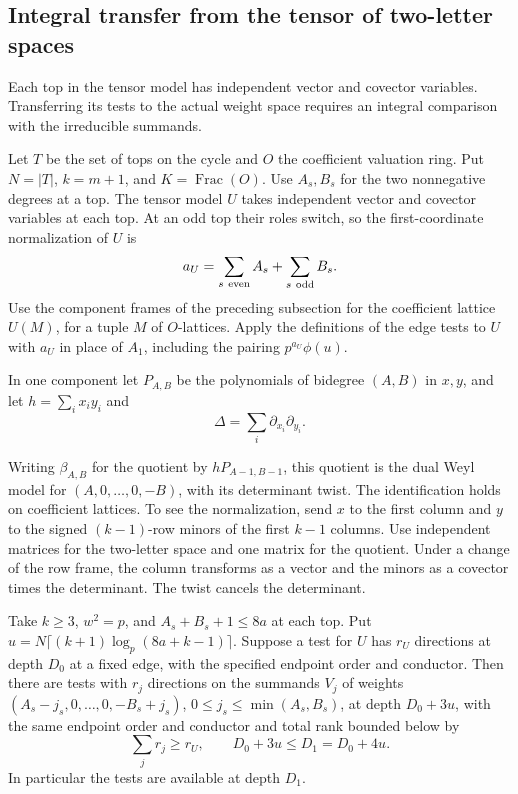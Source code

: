 \subsection{Integral transfer from the tensor of two-letter spaces}
\label{sec:edge-transfer}
\hypertarget{source-edge-transfer}{}

Each top in the tensor model has independent vector and covector variables. Transferring its tests to the actual weight space requires an integral comparison with the irreducible summands.

Let \(T\) be the set of tops on the cycle and \(O\) the coefficient valuation ring. Put \(N=|T|\), \(k=m+1\), and \(K=\operatorname{Frac}(O)\).
Use \(A_s,B_s\) for the two nonnegative degrees at a top.
The tensor model \(U\) takes independent vector and covector
variables at each top. At an odd top their roles switch, so the
first-coordinate normalization of \(U\) is
\[
 a_U=\sum_{s\ {\rm even}}A_s+\sum_{s\ {\rm odd}}B_s.
\]
Use the component frames of the preceding subsection for the
coefficient lattice \(U(M)\), for a tuple \(M\) of \(O\)-lattices.
Apply the definitions of the edge tests to \(U\) with \(a_U\) in
place of \(A_1\), including the pairing \(p^{a_U}\phi(u)\).

In one component let \(P_{A,B}\) be the polynomials of bidegree
\((A,B)\) in \(x,y\), and let \(h=\sum_i x_i y_i\) and
\[
 \Delta=\sum_i\partial_{x_i}\partial_{y_i}.
\]

Writing \(\beta_{A,B}\) for the quotient by \(hP_{A-1,B-1}\),
this quotient is the dual Weyl model for
\((A,0,\ldots,0,-B)\), with its determinant twist.
The identification holds on coefficient lattices. To see the
normalization, send \(x\) to the first column and \(y\) to the
signed \((k-1)\)-row minors of the first \(k-1\) columns. Use
independent matrices for the two-letter space and one matrix
for the quotient. Under a change of the row frame, the column
transforms as a vector and the minors as a covector times the
determinant. The twist cancels the determinant.

\begin{proposition}\label{prop:edge-test-transfer}
Take \(k\ge3\), \(w^2=p\), and \(A_s+B_s+1\le8a\) at each top.
Put \(u=N\lceil(k+1)\log_p(8a+k-1)\rceil\). Suppose a test for
\(U\) has \(r_U\) directions at depth \(D_0\) at a fixed edge,
with the specified endpoint order and conductor. Then there are
tests with \(r_j\) directions on the summands \(V_j\) of weights
\((A_s-j_s,0,\ldots,0,-B_s+j_s)\),
\(0\le j_s\le\min(A_s,B_s)\), at depth \(D_0+3u\), with
the same endpoint order and conductor and total rank bounded below by
\[
 \sum_j r_j\ge r_U,\qquad D_0+3u\le D_1=D_0+4u.
\]
In particular the tests are available at depth \(D_1\).
\end{proposition}

